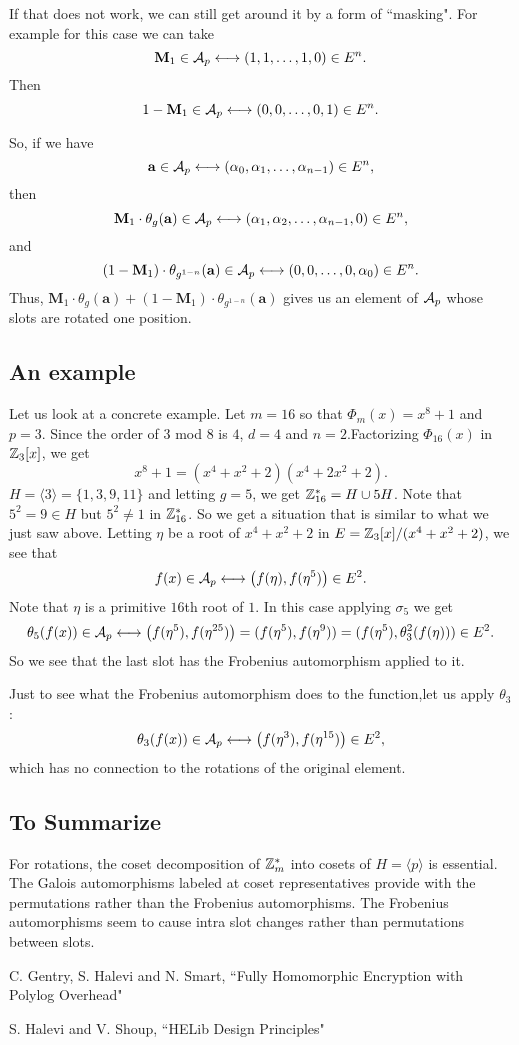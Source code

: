 \documentclass[12pt]{article}
\theoremstyle{plain}
\theoremstyle{definition}
\theoremstyle{remark}
\begin{document}
If that does not work, we can still get around it by a form of ``masking". For example for this case we can take
$$\mathbf{M}_1 \in \mathcal{A}_p \longleftrightarrow (1,1,\dots, 1,0) \in E^n.$$
Then $$1-\mathbf{M}_1 \in \mathcal{A}_p \longleftrightarrow (0,0,\dots, 0,1) \in E^n.$$

So, if we have
$$\mathbf{a}\in \mathcal{A}_p \longleftrightarrow (\alpha_0,\alpha_1,\dots, \alpha_{n-1}) \in E^n,$$
then
$$\mathbf{M}_1\cdot \theta_g(\mathbf{a}) \in \mathcal{A}_p \longleftrightarrow (\alpha_1,\alpha_2,\dots, \alpha_{n-1},0) \in E^n,$$
and
$$(1-\mathbf{M}_1)\cdot \theta_{g^{1-n}}(\mathbf{a}) \in \mathcal{A}_p \longleftrightarrow (0,0,\dots, 0,\alpha_0) \in E^n.$$
Thus,  $\mathbf{M}_1\cdot \theta_g(\mathbf{a})+(1-\mathbf{M}_1)\cdot \theta_{g^{1-n}}(\mathbf{a})$ gives us an element of $\mathcal{A}_p$ whose slots are rotated one position.

\subsection{An example} Let us look at a concrete example.
Let $m=16$ so that $\Phi_m(x)=x^8+1$ and $p=3$. Since the order of $3$ mod 8 is $4$, $d=4$ and $n=2$.Factorizing $\Phi_{16}(x)$ in $\mathbb{Z}_3[x]$, we get
$$x^8+1 = (x^4+x^2+2)(x^4+2x^2+2).$$
$H=\langle 3\rangle = \{1,3,9,11\}$ and letting $g=5$, we get
$\mathbb{Z}_{16}^* = H\cup 5H$. Note that $5^2=9 \in H$ but $5^2 \neq 1$ in $\mathbb{Z}_{16}^*$.
So we get a situation that is similar to what we just saw above.
Letting $\eta$ be a root of $x^4+x^2+2$ in $E = \mathbb{Z}_3[x]/(x^4+x^2+2)$, we see that
$$f(x) \in \mathcal{A}_p \longleftrightarrow \left (f(\eta),f(\eta^5)\right ) \in E^2.$$ Note that $\eta$ is a primitive $16$th root of $1$.
In this case applying $\sigma_5$ we get
$$\theta_5(f(x)) \in \mathcal{A}_p \longleftrightarrow \left (f(\eta^5),f(\eta^{25})\right ) = (f(\eta^5), f(\eta^9)) =(f(\eta^5), \theta_3^2(f(\eta)))\in E^2.$$
So we see that the last slot has the Frobenius automorphism applied to it.

Just to see what the Frobenius automorphism does to the function,let us apply $\theta_3$:
$$\theta_3(f(x)) \in \mathcal{A}_p \longleftrightarrow \left (f(\eta^3),f(\eta^{15})\right ) \in E^2,$$
which has no connection to the rotations of the original element.

\subsection{To Summarize}
For rotations, the coset decomposition of $\mathbb{Z}_m^{*}$ into cosets of $H=\langle p\rangle$ is essential. The Galois automorphisms labeled at coset representatives provide with the permutations rather than the Frobenius automorphisms. The Frobenius automorphisms seem to cause intra slot changes rather than permutations between slots.

\begin{thebibliography}{99}

 C. Gentry, S. Halevi and N. Smart, ``Fully Homomorphic
Encryption with Polylog Overhead"

 S. Halevi and V. Shoup, ``HELib Design Principles"
\end{thebibliography}
\end{document}
